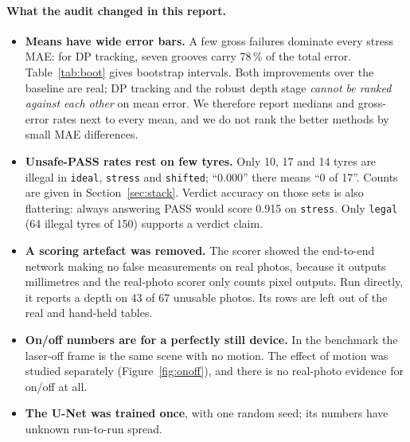 \paragraph{What the audit changed in this report.}
\begin{itemize}
\item \textbf{Means have wide error bars.} A few gross failures dominate every stress MAE: for DP tracking, seven
      grooves carry 78\,\% of the total error. Table~\ref{tab:boot} gives bootstrap intervals. Both improvements over
      the baseline are real; DP tracking and the robust depth stage \emph{cannot be ranked against each other} on
      mean error. We therefore report medians and gross-error rates next to every mean, and we do not rank the
      better methods by small MAE differences.
\item \textbf{Unsafe-PASS rates rest on few tyres.} Only 10, 17 and 14 tyres are illegal in \texttt{ideal},
      \texttt{stress} and \texttt{shifted}; ``0.000'' there means ``0 of 17''. Counts are given in
      Section~\ref{sec:stack}. Verdict accuracy on those sets is also flattering: always answering PASS would score
      0.915 on \texttt{stress}. Only \texttt{legal} (64 illegal tyres of 150) supports a verdict claim.
\item \textbf{A scoring artefact was removed.} The scorer showed the end-to-end network making no false measurements
      on real photos, because it outputs millimetres and the real-photo scorer only counts pixel outputs. Run
      directly, it reports a depth on 43 of 67 unusable photos. Its rows are left out of the real and hand-held
      tables.
\item \textbf{On/off numbers are for a perfectly still device.} In the benchmark the laser-off frame is the same
      scene with no motion. The effect of motion was studied separately (Figure~\ref{fig:onoff}), and there is no
      real-photo evidence for on/off at all.
\item \textbf{The U-Net was trained once}, with one random seed; its numbers have unknown run-to-run spread.
\end{itemize}

